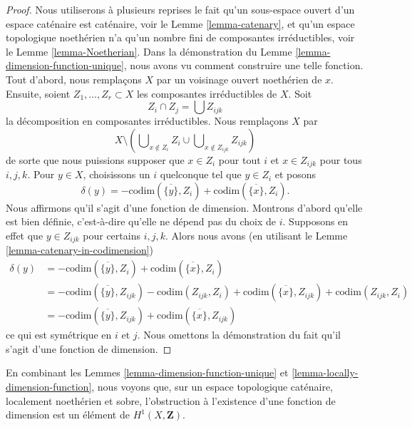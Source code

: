 \begin{proof}
Nous utiliserons à plusieurs reprises
le fait qu'un sous-espace ouvert d'un espace caténaire est caténaire, voir le
Lemme \ref{lemma-catenary}, et qu'un espace topologique noethérien
n'a qu'un nombre fini de composantes irréductibles, voir le Lemme
\ref{lemma-Noetherian}.
Dans la démonstration du Lemme \ref{lemma-dimension-function-unique}, nous avons
vu comment construire une telle fonction. Tout d'abord, nous remplaçons $X$
par un voisinage ouvert noethérien de $x$. Ensuite, soient
$Z_1, \ldots, Z_r \subset X$ les composantes irréductibles de $X$. Soit
$$
Z_i \cap Z_j = \bigcup Z_{ijk}
$$
la décomposition en composantes irréductibles. Nous remplaçons
$X$ par
$$
X \setminus \left(
\bigcup\nolimits_{x \not \in Z_i} Z_i
\cup
\bigcup\nolimits_{x \not \in Z_{ijk}} Z_{ijk}
\right)
$$
de sorte que nous puissions supposer que $x \in Z_i$ pour tout $i$ et
$x \in Z_{ijk}$ pour tous $i, j, k$. Pour $y \in X$, choisissons un
$i$ quelconque tel que $y \in Z_i$ et posons
$$
\delta(y) = - \text{codim}(\overline{\{y\}}, Z_i)
+ \text{codim}(\overline{\{x\}}, Z_i).
$$
Nous affirmons qu'il s'agit d'une fonction de dimension. Montrons d'abord
qu'elle est bien définie, c'est-à-dire qu'elle ne dépend pas du choix de $i$.
Supposons en effet que $y \in Z_{ijk}$ pour certains $i, j, k$.
Alors nous avons (en utilisant le Lemme
\ref{lemma-catenary-in-codimension})
\begin{align*}
\delta(y) & =
- \text{codim}(\overline{\{y\}}, Z_i)
+ \text{codim}(\overline{\{x\}}, Z_i) \\
& =
- \text{codim}(\overline{\{y\}}, Z_{ijk})
- \text{codim}(Z_{ijk}, Z_i)
+ \text{codim}(\overline{\{x\}}, Z_{ijk})
+ \text{codim}(Z_{ijk}, Z_i) \\
& =
- \text{codim}(\overline{\{y\}}, Z_{ijk})
+ \text{codim}(\overline{\{x\}}, Z_{ijk})
\end{align*}
ce qui est symétrique en $i$ et $j$.
Nous omettons la démonstration du fait qu'il s'agit d'une fonction de dimension.
\end{proof}

\begin{remark}
\label{remark-obstruction-to-dimension-function}
En combinant les Lemmes \ref{lemma-dimension-function-unique} et
\ref{lemma-locally-dimension-function}, nous voyons que, sur un espace
topologique caténaire, localement noethérien et sobre, l'obstruction à
l'existence d'une fonction de dimension est un élément de
$H^1(X, \mathbf{Z})$.
\end{remark}



